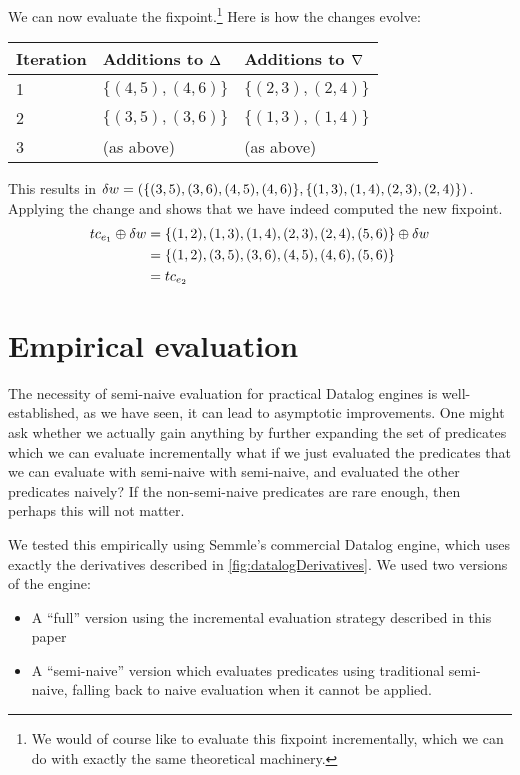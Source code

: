 We can now evaluate the fixpoint.\footnote{We would of course like to evaluate this fixpoint
  incrementally, which we can do with exactly the same theoretical machinery.}
Here is how the changes evolve:
\begin{center}
  \begin{tabular} {p{3.5em} p{10em} p{10em}}
    Iteration & Additions to $\Delta$ & Additions to $\nabla$ \\
    \toprule
    1 & $\{ (4,5), (4,6) \}$ & $\{ (2,3), (2,4) \}$\\
    2 & $\{ (3,5), (3,6) \}$ & $\{ (1,3), (1,4) \}$\\
    3 & (as above) & (as above) \\
    \bottomrule
  \end{tabular}
\end{center}
\medskip

This results in $\delta w = (\{ (3,5), (3,6), (4,5), (4,6)\}, \{(1,3), (1,4), (2,3), (2,4)\})$.
Applying the change and shows that we have indeed computed the new fixpoint.
\begin{align*}
  tc_{e_1} \oplus \delta w &= \{(1,2), (1,3), (1,4), (2,3), (2,4), (5,6)\} \oplus \delta w\\
  &= \{(1,2), (3,5), (3,6), (4,5), (4,6), (5,6)\}\\
  &= tc_{e_2}
\end{align*}

\section{Empirical evaluation}
\label{sec:empirical}

The necessity of semi-naive evaluation for practical Datalog engines is
well-established, as we have seen, it can lead to asymptotic improvements.
One might ask whether we actually gain anything by further expanding the set of predicates
which we can evaluate incrementally \textemdash{} what if we just evaluated the
predicates that we can evaluate with semi-naive with semi-naive, and evaluated
the other predicates naively? If the non-semi-naive predicates are rare enough, then perhaps this
will not matter.

We tested this empirically using Semmle's commercial Datalog engine, which uses
exactly the derivatives described in \cref{fig:datalogDerivatives}. We used two
versions of the engine:
\begin{itemize}
  \item A ``full'' version using the incremental evaluation strategy described in this paper
  \item A ``semi-naive'' version which evaluates predicates using traditional
    semi-naive, falling back to naive evaluation when it cannot be applied.
\end{itemize}

